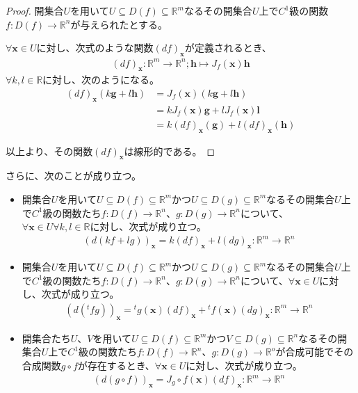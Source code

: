 \documentclass[dvipdfmx]{jsarticle}
\begin{document}
\begin{proof}
開集合$U$を用いて$U \subseteq D(f) \subseteq \mathbb{R}^{m}$なるその開集合$U$上で$C^{1}$級の関数$f:D(f) \rightarrow \mathbb{R}^{n}$が与えられたとする。\par
$\forall\mathbf{x} \in U$に対し、次式のような関数$(df)_{\mathbf{x}}$が定義されるとき、
\begin{align*}
(df)_{\mathbf{x}}:\mathbb{R}^{m} \rightarrow \mathbb{R}^{n};\mathbf{h} \mapsto J_{f}\left( \mathbf{x} \right)\mathbf{h}
\end{align*}
$\forall k,l \in \mathbb{R}$に対し、次のようになる。
\begin{align*}
(df)_{\mathbf{x}}\left( k\mathbf{g} + l\mathbf{h} \right) &= J_{f}\left( \mathbf{x} \right)\left( k\mathbf{g} + l\mathbf{h} \right)\\
&= kJ_{f}\left( \mathbf{x} \right)\mathbf{g} + lJ_{f}\left( \mathbf{x} \right)\mathbf{l}\\
&= k(df)_{\mathbf{x}}\left( \mathbf{g} \right) + l(df)_{\mathbf{x}}\left( \mathbf{h} \right)
\end{align*}\par
以上より、その関数$(df)_{\mathbf{x}}$は線形的である。
\end{proof}
\begin{thm}\label{4.2.7.5} さらに、次のことが成り立つ。
\begin{itemize}
\item
  開集合$U$を用いて$U \subseteq D(f) \subseteq \mathbb{R}^{m}$かつ$U \subseteq D(g) \subseteq \mathbb{R}^{m}$なるその開集合$U$上で$C^{1}$級の関数たち$f:D(f) \rightarrow \mathbb{R}^{n}$、$g:D(g) \rightarrow \mathbb{R}^{n}$について、$\forall\mathbf{x} \in U\forall k,l \in \mathbb{R}$に対し、次式が成り立つ。
\begin{align*}
\left( d(kf + lg) \right)_{\mathbf{x}} = k(df)_{\mathbf{x}} + l(dg)_{\mathbf{x}}:\mathbb{R}^{m} \rightarrow \mathbb{R}^{n}
\end{align*}
\item
  開集合$U$を用いて$U \subseteq D(f) \subseteq \mathbb{R}^{m}$かつ$U \subseteq D(g) \subseteq \mathbb{R}^{m}$なるその開集合$U$上で$C^{1}$級の関数たち$f:D(f) \rightarrow \mathbb{R}^{n}$、$g:D(g) \rightarrow \mathbb{R}^{n}$について、$\forall\mathbf{x} \in U$に対し、次式が成り立つ。
\begin{align*}
\left( d\left({}^{t}fg \right) \right)_{\mathbf{x}} ={}^{t}g\left( \mathbf{x} \right)(df)_{\mathbf{x}} +{}^{t}f\left( \mathbf{x} \right)(dg)_{\mathbf{x}}:\mathbb{R}^{m} \rightarrow \mathbb{R}^{n}
\end{align*}
\item
  開集合たち$U、V$を用いて$U \subseteq D(f) \subseteq \mathbb{R}^{m}$かつ$V \subseteq D(g) \subseteq \mathbb{R}^{n}$なるその開集合$U$上で$C^{1}$級の関数たち$f:D(f) \rightarrow \mathbb{R}^{n}$、$g:D(g) \rightarrow \mathbb{R}^{o}$が合成可能でその合成関数$g \circ f$が存在するとき、$\forall\mathbf{x} \in U$に対し、次式が成り立つ。
\begin{align*}
\left( d(g \circ f) \right)_{\mathbf{x}} = J_{g} \circ f\left( \mathbf{x} \right)(df)_{\mathbf{x}}:\mathbb{R}^{m} \rightarrow \mathbb{R}^{n}
\end{align*}
\end{itemize}
\end{thm}
\end{document}

